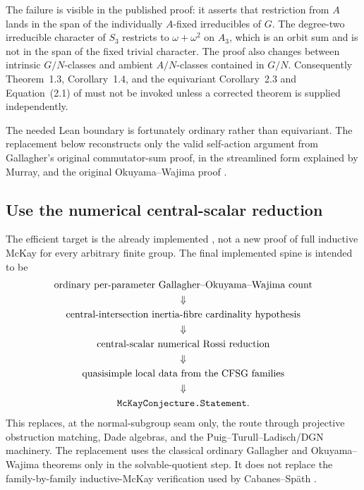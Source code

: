\documentclass[11pt]{article}
\begin{document}
The failure is visible in the published proof: it asserts that restriction
from \(A\) lands in the span of the individually \(A\)-fixed irreducibles of
\(G\).  The degree-two irreducible character of \(S_3\) restricts to
\(\omega+\omega^2\) on \(A_3\), which is an orbit sum and is not in the
span of the fixed trivial character.  The proof also changes between
intrinsic \(G/N\)-classes and ambient \(A/N\)-classes contained in \(G/N\).
Consequently Theorem~1.3, Corollary~1.4, and the equivariant Corollary~2.3
and Equation~(2.1) of \cite{MaltempoVallejo2026} must not be invoked unless
a corrected theorem is supplied independently.

The needed Lean boundary is fortunately ordinary rather than equivariant.
The replacement below reconstructs only the valid self-action argument from
Gallagher's original commutator-sum proof, in the streamlined form explained
by Murray, and the original Okuyama--Wajima proof
\cite{Gallagher1971,Murray2023,Navarro2018,OkuyamaWajima1980}.

\subsection{Use the numerical central-scalar reduction}

The efficient target is the already implemented
, not a new proof of full
inductive McKay for every arbitrary finite group.  The final implemented
spine is intended to be
\[
\begin{gathered}
\text{ordinary per-parameter Gallagher--Okuyama--Wajima count}\\
\Downarrow\\
\text{central-intersection inertia-fibre cardinality hypothesis}\\
\Downarrow\\
\text{central-scalar numerical Rossi reduction}\\
\Downarrow\\
\text{quasisimple local data from the CFSG families}\\
\Downarrow\\
\text{\texttt{McKayConjecture.Statement}}.
\end{gathered}
\]
This replaces, at the normal-subgroup seam only, the route through
projective obstruction matching, Dade algebras, and the
Puig--Turull--Ladisch/DGN machinery.  The replacement uses the classical
ordinary Gallagher and Okuyama--Wajima theorems only in the solvable-quotient
step.  It does not replace the family-by-family inductive-McKay verification
used by Cabanes--Sp\"ath \cite{CabanesSpath2026}.
\end{document}
